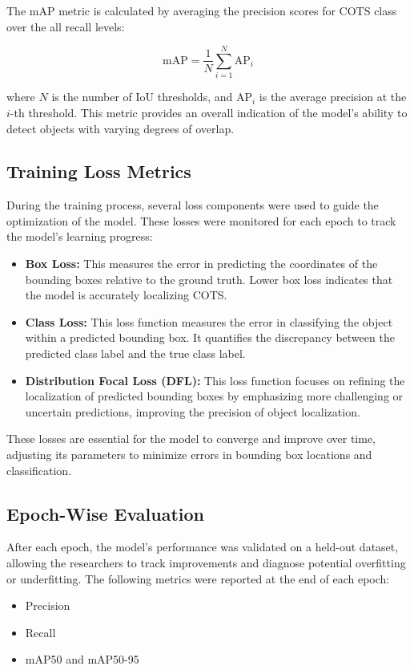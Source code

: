 \documentclass[conference]{IEEEtran}
\begin{document}
The mAP metric is calculated by averaging the precision scores for COTS class over the all recall levels:

\begin{equation}
\text{mAP} = \frac{1}{N} \sum_{i=1}^{N} \text{AP}_i
\end{equation}

where $N$ is the number of IoU thresholds, and $\text{AP}_i$ is the average precision at the $i$-th threshold. This metric provides an overall indication of the model's ability to detect objects with varying degrees of overlap.

\subsection{Training Loss Metrics}
During the training process, several loss components were used to guide the optimization of the model. These losses were monitored for each epoch to track the model's learning progress:

\begin{itemize}
    \item \textbf{Box Loss:} This measures the error in predicting the coordinates of the bounding boxes relative to the ground truth. Lower box loss indicates that the model is accurately localizing COTS.
    \item \textbf{Class Loss:} This loss function measures the error in classifying the object within a predicted bounding box. It quantifies the discrepancy between the predicted class label and the true class label.
    \item \textbf{Distribution Focal Loss (DFL):} This loss function focuses on refining the localization of predicted bounding boxes by emphasizing more challenging or uncertain predictions, improving the precision of object localization.
\end{itemize}

These losses are essential for the model to converge and improve over time, adjusting its parameters to minimize errors in bounding box locations and classification.

\subsection{Epoch-Wise Evaluation}
After each epoch, the model's performance was validated on a held-out dataset, allowing the researchers to track improvements and diagnose potential overfitting or underfitting. The following metrics were reported at the end of each epoch:
\begin{itemize}
    \item Precision
    \item Recall
    \item mAP50 and mAP50-95
\end{itemize}
\end{document}
